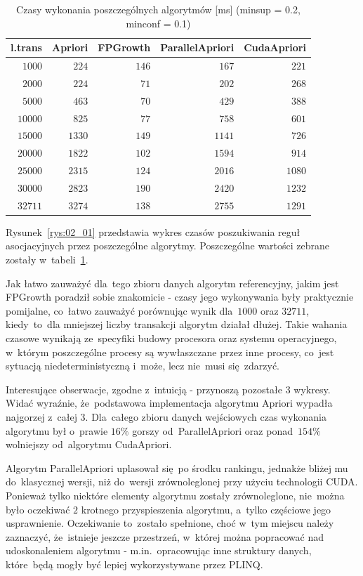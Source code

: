 \begin{table}
	\centering
	\begin{tabular}{r|r|r|r|r}
	\textbf{l.trans} & \textbf{Apriori} & \textbf{FPGrowth} & \textbf{ParallelApriori} & \textbf{CudaApriori} \\ \hline
	$1000$ & $224$ & $146$ & $167$ & $221$ \\
	$2000$ & $224$ & $71$ & $202$ & $268$ \\
	$5000$ & $463$ & $70$ & $429$ & $388$ \\
	$10000$ & $825$ & $77$ & $758$ & $601$ \\
	$15000$ & $1330$ & $149$ & $1141$ & $726$ \\
	$20000$ & $1822$ & $102$ & $1594$ & $914$ \\
	$25000$ & $2315$ & $124$ & $2016$ & $1080$ \\
	$30000$ & $2823$ & $190$ & $2420$ & $1232$ \\
	$32711$ & $3274$ & $138$ & $2755$ & $1291$ \\
	\end{tabular}
	\caption{Czasy wykonania poszczególnych algorytmów [ms] (minsup = 0.2, minconf = 0.1)\label{tab:02_01}}
\end{table}

Rysunek~\ref{rys:02_01} przedstawia wykres czasów poszukiwania reguł asocjacyjnych przez poszczególne algorytmy. Poszczególne wartości zebrane zostały w~tabeli~\ref{tab:02_01}. 

Jak łatwo zauważyć dla~tego zbioru danych algorytm referencyjny, jakim jest FPGrowth poradził sobie znakomicie - czasy jego wykonywania były praktycznie pomijalne, co~łatwo zauważyć porównując wynik dla~$1000$ oraz $32711$, kiedy~to~dla mniejszej liczby transakcji algorytm działał dłużej. Takie wahania czasowe wynikają ze~specyfiki budowy procesora oraz systemu operacyjnego, w~którym poszczególne procesy są wywłaszczane przez inne procesy, co~jest sytuacją niedeterministyczną i~może, lecz nie~musi się~zdarzyć.

Interesujące obserwacje, zgodne z~intuicją - przynoszą pozostałe 3 wykresy. Widać wyraźnie, że~podstawowa implementacja algorytmu Apriori wypadła najgorzej z~całej 3. Dla~całego zbioru danych wejściowych czas wykonania algorytmu był o~prawie $16\%$ gorszy od~ParallelApriori oraz ponad~$154\%$ wolniejszy od~algorytmu CudaApriori. 

Algorytm ParallelApriori uplasował się~po środku rankingu, jednakże bliżej mu do~klasycznej wersji, niż do~wersji zrównoleglonej przy użyciu technologii CUDA. Ponieważ tylko niektóre elementy algorytmu zostały zrównoleglone, nie~można było oczekiwać $2$ krotnego przyspieszenia algorytmu, a~tylko częściowe jego usprawnienie. Oczekiwanie to~zostało spełnione, choć w~tym miejscu należy zaznaczyć, że~istnieje jeszcze przestrzeń, w~której można popracować nad udoskonaleniem algorytmu - m.in.~opracowując inne struktury danych, które~będą mogły być lepiej wykorzystywane przez PLINQ.

